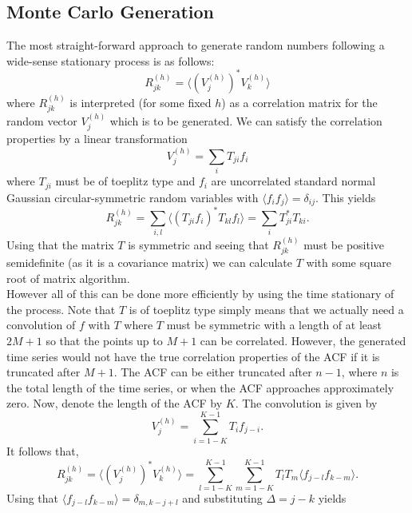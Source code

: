 \documentclass[18pt,a4paper]{extarticle}
\begin{document}
\subsection{Monte Carlo Generation}
The most straight-forward approach to generate random numbers following a wide-sense stationary process is as follows:
\begin{equation}
R^{(h)}_{jk} = \langle (V_{j}^{(h)})^* V_k^{(h)} \rangle
\end{equation}
where $R^{(h)}_{jk}$ is interpreted (for some fixed $h$) as a correlation matrix for the random vector $V_{j}^{(h)}$ which is to be generated.
We can satisfy the correlation properties by a linear transformation
\begin{equation}
V_j^{(h)} = \sum_{i} T_{ji}f_i
\end{equation}
where $T_{ji}$ must be of toeplitz type and $f_i$ are uncorrelated standard normal Gaussian circular-symmetric random variables with $\langle f_i f_j \rangle = \delta_{ij}$.
This yields
\begin{equation}
R^{(h)}_{jk} = \sum_{i,l} \langle (T_{ji}f_i)^* T_{kl}f_l \rangle = \sum_{i} T_{ji}^* T_{ki}.
\end{equation}
Using that the matrix $T$ is symmetric and seeing that $R^{(h)}_{jk}$ must be positive semidefinite (as it is a covariance matrix) we can calculate $T$ with some square root of matrix algorithm.\\
However all of this can be done more efficiently by using the time stationary of the process.
Note that $T$ is of toeplitz type simply means that we actually need a convolution of $f$ with $T$ where $T$ must be symmetric with a length of at least $2M + 1$ so that the points up to $M + 1$ can be correlated.
However, the generated time series would not have the true correlation properties of the ACF if it is truncated after $M+1$.
The ACF can be either truncated after $n-1$, where $n$ is the total length of the time series, or when the ACF approaches approximately zero.
Now, denote the length of the ACF by $K$.
The convolution is given by
\begin{equation}
V_j^{(h)} = \sum_{i=1-K}^{K-1} T_{i}f_{j - i}.
\end{equation}
It follows that,
\begin{equation}
R^{(h)}_{jk} = \langle (V_{j}^{(h)})^* V_k^{(h)} \rangle = \sum_{l=1-K}^{K-1} \sum_{m=1 - K}^{K-1} T_{l} T_{m} \langle f_{j - l} f_{k - m} \rangle.
\end{equation}
Using that $\langle f_{j - l} f_{k - m} \rangle = \delta_{m, k - j + l}$ and substituting $\Delta=j-k$ yields
\end{document}
